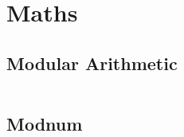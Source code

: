 \section{Maths}
  \subsection{Modular Arithmetic}
    \inputminted{cpp}{library/maths/mod.hpp}

  \subsection{Modnum}
    \inputminted{cpp}{library/maths/modnum.hpp}